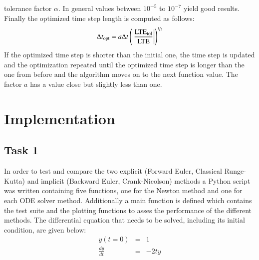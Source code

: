 \documentclass{aa}
\begin{document}
tolerance factor \(\alpha\). In general values between \(10^{-5}\) to \(10^{-7}\) yield good
results. Finally the optimized time step length is computed as follows:
\begin{equation}
    \label{eqn:t_opt}
    \Delta t_\mathrm{opt} = a \Delta t
    \left(\left|\frac{\mathrm{LTE}_\mathrm{tol}}{\mathrm{LTE}}\right|\right)^{\nicefrac{1}{5}}
\end{equation}
If the optimized time step is shorter than the initial one, the time step is updated and the
optimization repeated until the optimized time step is longer than the one from before and the
algorithm moves on to the next function value. The factor \(a\) has a value close but slightly
less than one.

\section{Implementation}%
\label{sec:implementation}

\subsection{Task 1}%
\label{sub:task_1}

In order to test and compare the two explicit (Forward Euler, Classical Runge-Kutta) and
implicit (Backward Euler, Crank-Nicolson) methods a Python script was written containing five
functions, one for the Newton method and one for each ODE solver method. Additionally a main
function is defined which contains the test suite and the plotting functions to asses the
performance of the different methods. The differential equation that needs to be solved,
including its initial condition, are given below:
\begin{eqnarray}
    \label{equ:init_1}
    y(t = 0) & = & 1 \\ \label{equ:ode_1}
    \frac{dy}{dt} & = & -2ty
\end{eqnarray}
\end{document}

